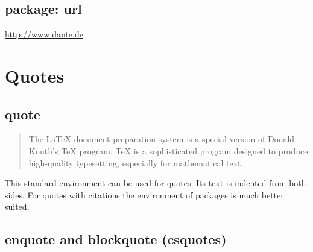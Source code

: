 \subsection{package: url}

\begin{filecontents*}{\democodefile}
\url{http://www.dante.de}
\end{filecontents*}

%

%
\section{Quotes}
\label{sec:demo:quote}

\subsection{quote}

\begin{filecontents*}{\democodefile}
\begin{quote}
The \LaTeX{} document preparation system is a special version of Donald
Knuth's \TeX{} program. \TeX{} is a sophisticated program designed to 
produce high-quality typesetting, especially for mathematical text.
\end{quote}
\end{filecontents*}

This standard environment can be used for quotes. Its text is indented from both sides. For quotes with citations the  environment of packages  is much better suited.

%

\subsection{enquote and blockquote (csquotes)}

